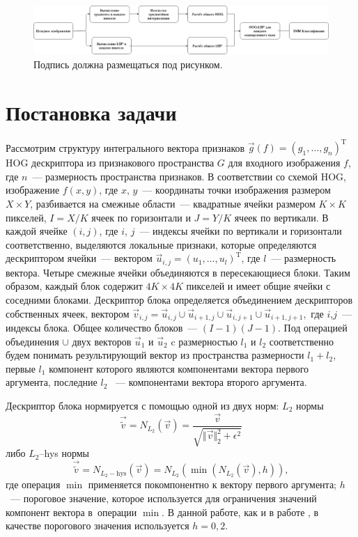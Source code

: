 \documentclass[12pt,twoside]{article}
\begin{document}
\begin{figure}[H]
	\includegraphics[width=1\textwidth]{Graph}
	\caption{Подпись должна размещаться под рисунком. }
	\label{fg:Wang1}
\end{figure}




\section{Постановка задачи}
Рассмотрим структуру интегрального вектора признаков $\vec{g}(f) = (g_{1},\dots , g_{n})^{\mathrm{T}}$ HOG дескриптора \cite{dalaltriggs2005} из признакового пространства $G$ для входного изображения $f$, где $n$~--- размерность пространства признаков. В соответствии со схемой
HOG, изображение $f(x,y)$, где $x$, $y$~--– координаты точки изображения размером $X\times Y$, разбивается на смежные области~--– квадратные ячейки размером $K\times K$ пикселей, $I=X/K$ ячеек по горизонтали и $J=Y/K$ ячеек по вертикали. 
В каждой ячейке $(i,j)$, где $i$, $j$~--- индексы ячейки по вертикали 	и горизонтали соответственно, выделяются локальные признаки, которые определяются дескриптором ячейки~--- вектором $\vec{u}_{i,j} = (u_1, \dots , u_l)^{\mathrm{T}}$, где $l$~---	размерность вектора. Четыре смежные ячейки объединяются в пересекающиеся блоки. Таким образом, каждый блок содержит $4K \times 4K$ пикселей и имеет общие ячейки с соседними блоками. Дескриптор блока определяется объединением дескрипторов собственных ячеек, вектором $\vec{v}_{i,j} = \vec{u}_{i,j}\cup\vec{u}_{i+1,j}\cup\vec{u}_{i,j+1}
	\cup\vec{u}_{i+1,j+1},$ где $i$,$j$~--- индексы блока.
	Общее количество блоков~--- $(I-1)(J-1)$. Под операцией
	объединения $\cup$ двух векторов $\vec{u}_{1}$ и $\vec{u}_{2}$
	c размерностью $l_{1}$ и $l_{2}$ соответственно будем понимать результирующий вектор из пространства размерности $l_{1}+l_{2}$, первые $l_{1}$ компонент которого являются компонентами вектора первого аргумента, последние $l_{2}$ ~--- компонентами вектора второго аргумента.
	
	 Дескриптор блока нормируется с помощью одной из двух норм:
		 $L_2$ нормы
\begin{equation*}
	\vec{\tilde{v}} = N_{L_{2}}(\vec{v}) =  \frac{\vec{v}}{\sqrt{\Vert \vec{v} \Vert_{2}^{2} + \epsilon^{2}}}
	\label{eq:L2}
\end{equation*}
либо $L_2$--hys нормы \cite{dalaltriggs2005}
\begin{equation*}
	\vec{\tilde{v}} = N_{L_{2}-\mathrm{hys}}(\vec{v}) =  N_{L_{2}}
	\left(\min(N_{L_{2}}(\vec{v}),h)\right),
	\label{eq:L2-hys}
\end{equation*}
где операция $\min$ применяется покомпонентно к вектору первого
аргумента; $h$~--- пороговое значение, которое используется для
ограничения значений компонент вектора в~операции $\min$. В данной работе, как и в работе \cite{dalaltriggs2005}, в качестве порогового значения используется $h=0{,}2$.
\end{document}
